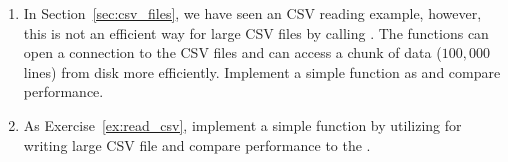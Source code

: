 \begin{enumerate}[label=\thechapter-\arabic*]
\item \label{ex:read_csv}
In Section~\ref{sec:csv_files}, we have seen an CSV reading example, however,
this is not an efficient way for large CSV files by calling .
The  functions  can open a connection to
the CSV files and  can access a chunk of
data ($100,000$ lines)
from disk more efficiently. Implement a simple function as 
and compare performance.

\item
As Exercise~\ref{ex:read_csv}, implement a simple function by utilizing
 for writing large CSV file and compare performance
to the .

\end{enumerate}
